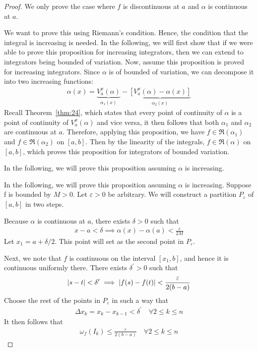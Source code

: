 \documentclass[thmcnt=section, color=blue, 12pt]{my-elegantbook}
\begin{document}
\begin{proof}
	We only prove the case where $f$ is discontinuous at $a$
	and $\alpha$ is continuous at $a$.

	We want to prove this using Riemann's condition.
	Hence, the condition that the integral is increasing is needed.
	In the following,
	we will first show that if we were able to prove this proposition
	for increasing integrators,
	then we can extend to integrators being bounded of variation.
	Now, assume this proposition is proved for increasing integrators.
	Since $\alpha$ is of bounded of variation,
	we can decompose it into two increasing functions:
	\begin{align*}
		\alpha(x) = \underbrace{V_a^x(\alpha)}_{\alpha_1(x)}
		- \underbrace{ [V_a^x(\alpha) - \alpha(x)] }_{\alpha_2(x)}
	\end{align*}
	Recall Theorem~\ref{thm:24}, which states that every point of continuity
	of $\alpha$ is a point of continuity of $V_a^x(\alpha)$ and vice versa,
	it then follows that both $\alpha_1$ and $\alpha_2$
	are continuous at $a$.
	Therefore, applying this proposition,
	we have $f \in \mathfrak{R}(\alpha_1)$ and $f \in \mathfrak{R}(\alpha_2)$
	on $[a, b]$.
	Then by the linearity of the integrals, $f \in \mathfrak{R}(\alpha)$
	on $[a, b]$, which proves this proposition
	for integrators of bounded variation.

	In the following, we will prove this proposition
	assuming $\alpha$ is increasing.

	In the following, we will prove this proposition
	assuming $\alpha$ is increasing.
	Suppose f is bounded by $M > 0$.
	Let $\varepsilon > 0$ be arbitrary.
	We will construct a partition $P_\varepsilon$ of $[a, b]$
	in two steps.

	Because $\alpha$ is continuous at $a$,
	there exists $\delta > 0$ such that
	\begin{align*}
		x - a < \delta
		\implies \alpha(x) - \alpha(a) < \frac{\varepsilon}{2M}
	\end{align*}
	Let $x_1 = a + \delta/ 2$.
	This point will set as the second point in $P_\varepsilon$.

	Next, we note that $f$ is continuous
	on the interval $[x_1, b]$, and hence
	it is continuous uniformly there.
	There exists $\delta^\prime > 0$ such that
	\begin{align*}
		\left\lvert s - t \right\rvert < \delta^\prime
		\implies \left\lvert f(s) - f(t) \right\rvert < \frac{\varepsilon}{2(b-a)}
	\end{align*}
	Choose the rest of the points in $P_\varepsilon$
	in such a way that
	\begin{align*}
		\Delta x_k = x_k - x_{k-1} < \delta^\prime
		\quad \forall 2 \leq k \leq n
	\end{align*}
	It then follows that
	\begin{align*}
		\omega_f(I_k) \leq \frac{\varepsilon}{2 (b-a)}
		\quad \forall 2 \leq  k \leq n
	\end{align*}


\end{proof}
\end{document}
